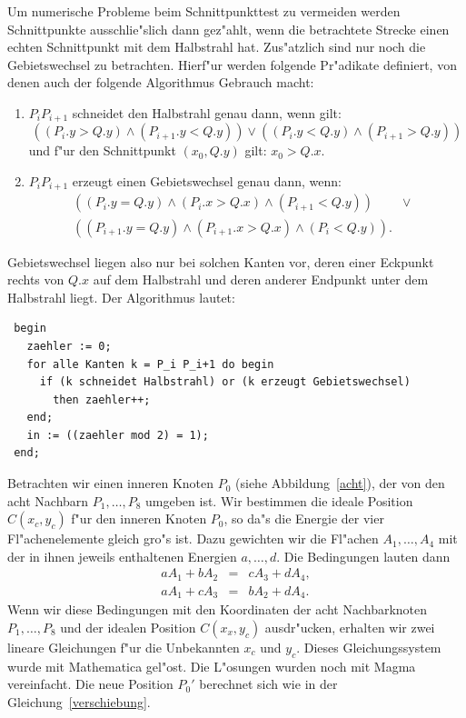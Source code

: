 \documentclass[11pt,a4paper]{article}
\begin{document}
    Um numerische Probleme beim Schnittpunkttest zu vermeiden werden Schnittpunkte ausschlie"slich dann gez"ahlt, wenn
    die betrachtete Strecke einen echten Schnittpunkt mit dem Halbstrahl hat. Zus"atzlich sind nur noch die
    Gebietswechsel zu betrachten. Hierf"ur werden folgende Pr"adikate definiert, von denen auch der folgende
    Algorithmus Gebrauch macht:
    \begin{enumerate}
      \item $P_i P_{i+1}$ schneidet den Halbstrahl genau dann, wenn gilt:
        $$ ((P_i.y > Q.y) \wedge (P_{i+1}.y < Q.y)) \vee ((P_i.y < Q.y) \wedge (P_{i+1} > Q.y)) $$
        und f"ur den Schnittpunkt $(x_0, Q.y)$ gilt: $x_0 > Q.x$.
      \item $P_i P_{i+1}$ erzeugt einen Gebietswechsel genau dann, wenn:
        \begin{eqnarray*}
          ((P_i.y = Q.y) \wedge (P_i.x > Q.x) \wedge (P_{i+1} < Q.y)) & \vee & \\
          ((P_{i+1}.y = Q.y) \wedge (P_{i+1}.x > Q.x) \wedge (P_i < Q.y)). & &
        \end{eqnarray*}
    \end{enumerate}
    Gebietswechsel liegen also nur bei solchen Kanten vor, deren einer Eckpunkt rechts von $Q.x$ auf dem Halbstrahl und deren
    anderer Endpunkt unter dem Halbstrahl liegt. Der Algorithmus lautet:
    \begin{verbatim}
 begin
   zaehler := 0;
   for alle Kanten k = P_i P_i+1 do begin
     if (k schneidet Halbstrahl) or (k erzeugt Gebietswechsel) 
       then zaehler++;
   end;
   in := ((zaehler mod 2) = 1);
 end;
    \end{verbatim}
    Betrachten wir einen inneren Knoten $P_0$ (siehe Abbildung~\ref{acht}), der von den acht Nachbarn 
    $P_1,\ldots,P_8$ umgeben ist. Wir bestimmen die ideale Position $C(x_c,y_c)$ f"ur den inneren Knoten $P_0$, so da"s 
    die Energie der vier Fl"achenelemente gleich gro"s ist. Dazu gewichten wir die Fl"achen $A_1,\ldots,A_4$ mit der
    in ihnen jeweils enthaltenen Energien $a,\ldots,d$. Die Bedingungen lauten dann
    \begin{eqnarray}
      a A_1 + b A_2 & = & c A_3 + d A_4, \\
      a A_1 + c A_3 & = & b A_2 + d A_4.
    \end{eqnarray}
    Wenn wir diese Bedingungen mit den Koordinaten der acht Nachbarknoten $P_1,\ldots,P_8$ und
    der idealen Position $C(x_x, y_c)$ ausdr"ucken, erhalten wir zwei lineare Gleichungen f"ur die
    Unbekannten $x_c$ und $y_c$. Dieses Gleichungssystem wurde mit Mathematica gel"ost. Die L"osungen
    wurden noch mit Magma vereinfacht. Die neue Position $P_0'$ berechnet sich wie in der Gleichung~\ref{verschiebung}.
\end{document}
